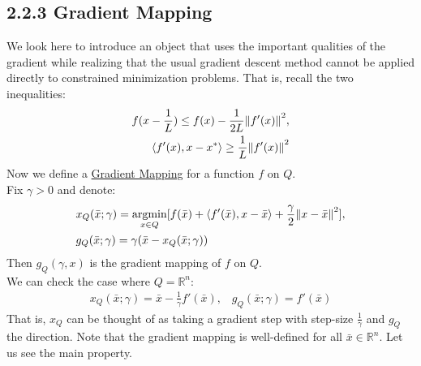 \documentclass[12pt,a4paper]{article}
\DeclareMathOperator*{\argmin}{argmin}
\begin{document}
	\subsection*{2.2.3 Gradient Mapping}\label{sec223GradMap}
	We look here to introduce an object that uses the important qualities of the gradient while realizing that the usual gradient descent method cannot be applied directly to constrained minimization problems. That is, recall the two inequalities:
	\begin{align}
		f(x - \frac{1}{L}) \leq f(x) - \frac{1}{2L}\norm{f'(x)}^2, \\
		\langle f'(x), x - x^* \rangle \geq \frac{1}{L}\norm{f'(x)}^2
	\end{align}
	Now we define a \hyperref[sec:Def]{Gradient Mapping} for a function $f$ on $Q$.\\
	Fix $\gamma > 0$ and denote:
	\begin{align*}
		&x_Q(\bar{x};\gamma) = \argmin_{x \in Q}[f(\bar{x}) + \langle f'(\bar{x}), x - \bar{x} \rangle + \frac{\gamma}{2}\norm{x - \bar{x}}^2], \\
		&g_Q(\bar{x}; \gamma) = \gamma(\bar{x} - x_Q(\bar{x};\gamma))
	\end{align*}
	Then $g_Q(\gamma,x)$ is the gradient mapping of $f$ on $Q$.
	 \\
	We can check the case where $Q = \mathbb{R}^n$:
	\begin{align*}
		x_Q(\bar{x};\gamma) = \bar{x} - \frac{1}{\gamma}f'(\bar{x}), \hspace{10pt} g_Q(\bar{x};\gamma) = f'(\bar{x})
	\end{align*}
	That is, $x_Q$ can be thought of as taking a gradient step with step-size $\frac{1}{\gamma}$ and $g_Q$ the direction. Note that the gradient mapping is well-defined for all $\bar{x} \in \mathbb{R}^n$. Let us see the main property.
	
\end{document}
